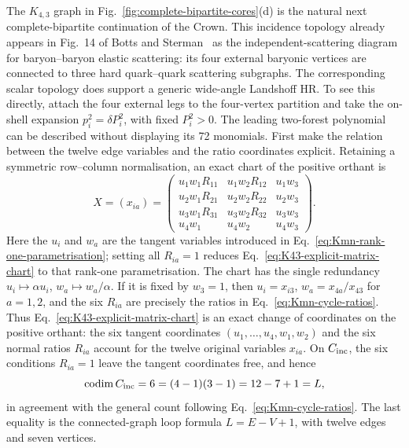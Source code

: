 \documentclass[a4paper,11pt]{article}
\begin{document}
The \(K_{4,3}\) graph in Fig.~\ref{fig:complete-bipartite-cores}(d) is the
natural next complete-bipartite continuation of the Crown.  This incidence
topology already appears in Fig.~14 of
Botts and Sterman~\cite{Botts:1989kf} as the independent-scattering diagram
for baryon--baryon elastic scattering: its four external baryonic vertices
are connected to three hard quark--quark scattering subgraphs.  The
corresponding scalar topology does support a generic wide-angle Landshoff
HR.  To see this directly, attach the four external legs to the four-vertex
partition and take the on-shell expansion
\(p_i^2=\delta P_i^2\), with fixed \(P_i^2>0\).  The leading two-forest
polynomial can be described without displaying its 72 monomials.  First make
the relation between the twelve edge variables and the ratio coordinates
explicit.  Retaining a symmetric row--column normalisation, an exact chart
of the positive orthant is
\begin{equation}
 X=(x_{ia})=
 \begin{pmatrix}
  u_1w_1R_{11}&u_1w_2R_{12}&u_1w_3\\
  u_2w_1R_{21}&u_2w_2R_{22}&u_2w_3\\
  u_3w_1R_{31}&u_3w_2R_{32}&u_3w_3\\
  u_4w_1&u_4w_2&u_4w_3
 \end{pmatrix}.
 \label{eq:K43-explicit-matrix-chart}
\end{equation}
Here the \(u_i\) and \(w_a\) are the tangent variables introduced in
Eq.~\eqref{eq:Kmn-rank-one-parametrisation}; setting all \(R_{ia}=1\) reduces
Eq.~\eqref{eq:K43-explicit-matrix-chart} to that rank-one parametrisation.
The chart has the single redundancy
\(u_i\mapsto\alpha u_i\), \(w_a\mapsto w_a/\alpha\).  If it is fixed by
\(w_3=1\), then \(u_i=x_{i3}\), \(w_a=x_{4a}/x_{43}\) for \(a=1,2\), and the
six \(R_{ia}\) are precisely the ratios in
Eq.~\eqref{eq:Kmn-cycle-ratios}.  Thus
Eq.~\eqref{eq:K43-explicit-matrix-chart} is an exact change of coordinates on
the positive orthant: the six tangent coordinates
\((u_1,\ldots,u_4,w_1,w_2)\) and the six normal ratios \(R_{ia}\) account for
the twelve original variables \(x_{ia}\).  On \(C_{\rm inc}\), the six
conditions \(R_{ia}=1\) leave the tangent coordinates free, and hence
\[
 \operatorname{codim}C_{\rm inc}=6=(4-1)(3-1)
 =12-7+1=L,
\]
in agreement with the general count following
Eq.~\eqref{eq:Kmn-cycle-ratios}.  The last equality is the connected-graph
loop formula \(L=E-V+1\), with twelve edges and seven vertices.
\end{document}
